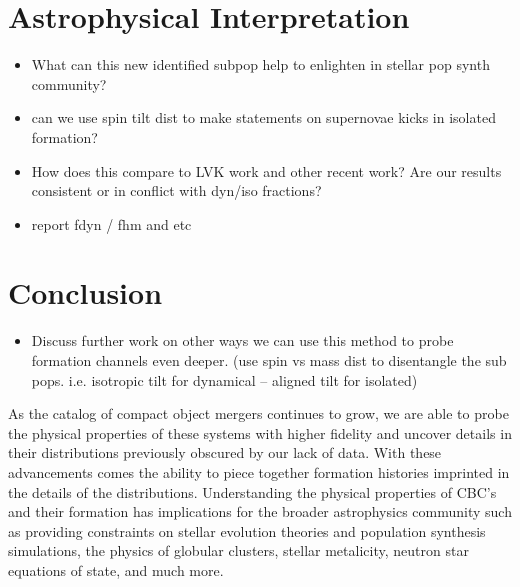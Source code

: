 \section{Astrophysical Interpretation} \label{sec:astro}

\begin{itemize}
    \item What can this new identified subpop help to enlighten in stellar pop synth community?
    \item can we use spin tilt dist to make statements on supernovae kicks in isolated formation?
    \item How does this compare to LVK work and other recent work? Are our results consistent or in conflict with dyn/iso fractions?
    \item report fdyn / fhm and etc
\end{itemize}



\section{Conclusion} \label{sec:conclusion}

\begin{itemize}
    \item Discuss further work on other ways we can use this method to probe formation channels even deeper. (use spin vs mass dist to disentangle the sub pops. i.e. isotropic tilt for dynamical -- aligned tilt for isolated)
\end{itemize}

As the catalog of compact object mergers continues to grow, we are able to probe the physical properties of these systems with higher fidelity and uncover details in their distributions previously obscured by our lack of data. With these advancements comes the ability to piece together formation histories imprinted in the details of the distributions. Understanding the physical properties of CBC's and their formation has implications for the broader astrophysics community such as providing constraints on stellar evolution theories and population synthesis simulations, the physics of globular clusters, stellar metalicity, neutron star equations of state, and much more. 

